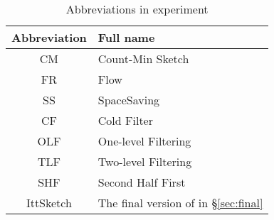 \begin{table}
\vspace{-0.05in}
\caption{Abbreviations in experiment}
\vspace{-0.1in}
\label{abbr}
\begin{tabular}{|c|l|}
\hline
Abbreviation&Full name\\
\hline
CM&Count-Min Sketch\cite{cmsketch}\\
\hline
FR&Flow\cite{flowradar}\\
\hline
SS&SpaceSaving\cite{spacesaving}\\
\hline
CF&Cold Filter\cite{coldfilter}\\
\hline
OLF&One-level Filtering\cite{superspreader}\\  
\hline
TLF&Two-level Filtering\cite{superspreader}\\
\hline
SHF&Second Half First\\
\hline
IttSketch&The final version of \sketchname{} in \S \ref{sec:final}\\
\hline
\end{tabular}
\end{table}